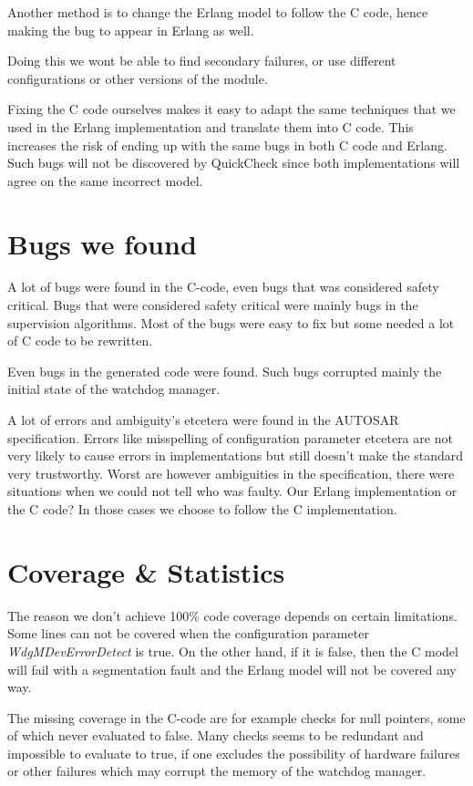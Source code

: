 \documentclass[a4paper]{article}
\begin{document}
Another method is to change the Erlang model to follow the C code,
hence making the bug to appear in Erlang as well.

Doing this we wont be able to find secondary failures, or use
different configurations or other versions of the module.

Fixing the C code ourselves makes it easy to adapt the same techniques
that we used in the Erlang implementation and translate them into C
code.
This increases the risk of ending up with the same bugs in both C code
and Erlang. Such bugs will not be discovered by QuickCheck since both
implementations will agree on the same incorrect model.

\section{Bugs we found}
A lot of bugs were found in the C-code, even bugs that was considered safety
critical.  Bugs that were considered safety critical were mainly bugs in the
supervision algorithms.  Most of the bugs were easy to fix but some needed a
lot of C code to be rewritten.

Even bugs in the generated code were found. Such bugs corrupted mainly the
initial state of the watchdog manager.

A lot of errors and ambiguity's etcetera were found in the AUTOSAR
specification. Errors like misspelling of configuration parameter etcetera are
not very likely to cause errors in implementations but still doesn't make the
standard very trustworthy. Worst are however ambiguities in the specification,
there were situations when we could not tell who was faulty. Our Erlang
implementation or the C code? In those cases we choose to follow the C
implementation.

\section{Coverage \& Statistics}
The reason we don't achieve 100\% code coverage depends on certain limitations.
Some lines can not be covered when the configuration parameter
\emph{WdgMDevErrorDetect} is true. On the other hand, if it is
false, then the C model will fail with a segmentation fault and the
Erlang model will not be covered any way.

The missing coverage in the C-code are for example checks for null
pointers, some of which never evaluated to false. Many checks seems to be
redundant and impossible to evaluate to true, if one excludes the possibility
of hardware failures or other failures which may corrupt the memory of the
watchdog manager.
\end{document}
